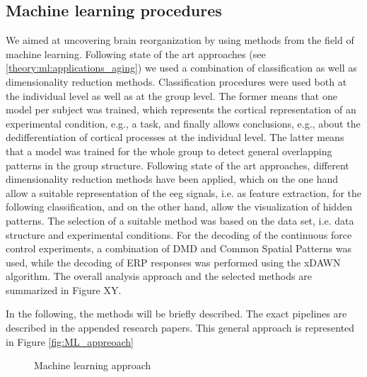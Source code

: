 \subsection{Machine learning procedures} 
We aimed at uncovering brain reorganization by using methods from the field of machine learning. Following state of the art approaches (see \autoref{theory:ml:applications_aging}) we used a combination of classification as well as dimensionality reduction methods. Classification procedures were used both at the individual level as well as at the group level. The former means that one model per subject was trained, which represents the cortical representation of an experimental condition, e.g., a task, and finally allows conclusions, e.g., about the dedifferentiation of cortical processes at the individual level. The latter means that a model was trained for the whole group to detect general overlapping patterns in the group structure. Following state of the art approaches, different dimensionality reduction methods have been applied, which on the one hand allow a suitable representation of the \gls{eeg} signals, i.e. as feature extraction, for the following classification, and on the other hand, allow the visualization of hidden patterns. The selection of a suitable method was based on the data set, i.e. data structure and experimental conditions. For the decoding of the continuous force control experiments, a combination of DMD and Common Spatial Patterns was used, while the decoding of ERP responses was performed using the xDAWN algorithm. The overall analysis approach and the selected methods are summarized in Figure XY. 

In the following, the methods will be briefly described. The exact pipelines are described in the appended research papers. This general approach is represented in Figure \autoref{fig:ML_appreoach}
\begin{figure}
  \caption{Machine learning approach}
  \label{fig:ML_appreoach}
\end{figure}

